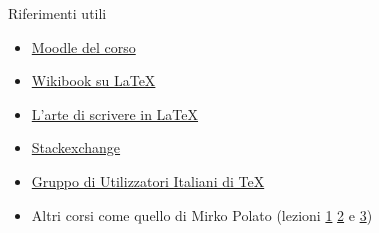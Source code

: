 \begin{frame}{Riferimenti utili}
    \begin{itemize}
      \item{\href{https://elearning.unipd.it/math/course/view.php?id=252}{Moodle 
del corso}}
      \item {\href{https://en.wikibooks.org/wiki/LaTeX/}{Wikibook su LaTeX}}
      \item {\href{http://www.lorenzopantieri.net/LaTeX_files/ArteLaTeX.pdf}
{L'arte di scrivere in LaTeX}}
      \item {\href{https://tex.stackexchange.com/}{Stackexchange}}
      \item {\href{http://www.guitex.org/}
{Gruppo di Utilizzatori Italiani di TeX}}
      \item Altri corsi come quello di Mirko Polato (lezioni 
{\href{http://www.math.unipd.it/~mpolato/didattica/latex/lesson_1.pdf}{1}}
{\href{http://www.math.unipd.it/~mpolato/didattica/latex/lesson_2.pdf}{2}}
e {\href{http://www.math.unipd.it/~mpolato/didattica/latex/lesson_3.pdf}{3}})
    \end{itemize}
\end{frame}
